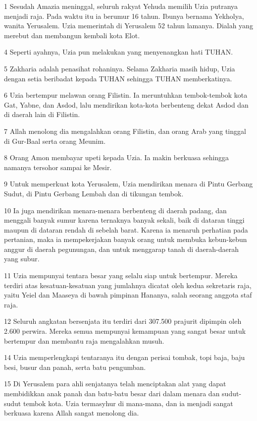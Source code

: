 \par 1 Sesudah Amazia meninggal, seluruh rakyat Yehuda memilih Uzia putranya menjadi raja. Pada waktu itu ia berumur 16 tahun. Ibunya bernama Yekholya, wanita Yerusalem. Uzia memerintah di Yerusalem 52 tahun lamanya. Dialah yang merebut dan membangun kembali kota Elot.
\par 4 Seperti ayahnya, Uzia pun melakukan yang menyenangkan hati TUHAN.
\par 5 Zakharia adalah penasihat rohaninya. Selama Zakharia masih hidup, Uzia dengan setia beribadat kepada TUHAN sehingga TUHAN memberkatinya.
\par 6 Uzia bertempur melawan orang Filistin. Ia meruntuhkan tembok-tembok kota Gat, Yabne, dan Asdod, lalu mendirikan kota-kota berbenteng dekat Asdod dan di daerah lain di Filistin.
\par 7 Allah menolong dia mengalahkan orang Filistin, dan orang Arab yang tinggal di Gur-Baal serta orang Meunim.
\par 8 Orang Amon membayar upeti kepada Uzia. Ia makin berkuasa sehingga namanya tersohor sampai ke Mesir.
\par 9 Untuk memperkuat kota Yerusalem, Uzia mendirikan menara di Pintu Gerbang Sudut, di Pintu Gerbang Lembah dan di tikungan tembok.
\par 10 Ia juga mendirikan menara-menara berbenteng di daerah padang, dan menggali banyak sumur karena ternaknya banyak sekali, baik di dataran tinggi maupun di dataran rendah di sebelah barat. Karena ia menaruh perhatian pada pertanian, maka ia mempekerjakan banyak orang untuk membuka kebun-kebun anggur di daerah pegunungan, dan untuk menggarap tanah di daerah-daerah yang subur.
\par 11 Uzia mempunyai tentara besar yang selalu siap untuk bertempur. Mereka terdiri atas kesatuan-kesatuan yang jumlahnya dicatat oleh kedua sekretaris raja, yaitu Yeiel dan Maaseya di bawah pimpinan Hananya, salah seorang anggota staf raja.
\par 12 Seluruh angkatan bersenjata itu terdiri dari 307.500 prajurit dipimpin oleh 2.600 perwira. Mereka semua mempunyai kemampuan yang sangat besar untuk bertempur dan membantu raja mengalahkan musuh.
\par 14 Uzia memperlengkapi tentaranya itu dengan perisai tombak, topi baja, baju besi, busur dan panah, serta batu pengumban.
\par 15 Di Yerusalem para ahli senjatanya telah menciptakan alat yang dapat membidikkan anak panah dan batu-batu besar dari dalam menara dan sudut-sudut tembok kota. Uzia termasyhur di mana-mana, dan ia menjadi sangat berkuasa karena Allah sangat menolong dia.
